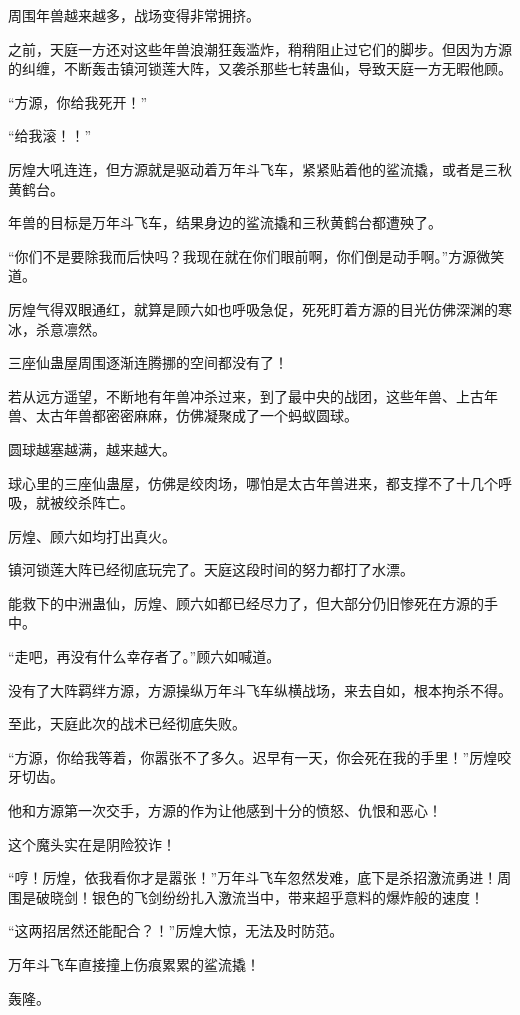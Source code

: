 \begin{this_body}
周围年兽越来越多，战场变得非常拥挤。

之前，天庭一方还对这些年兽浪潮狂轰滥炸，稍稍阻止过它们的脚步。但因为方源的纠缠，不断轰击镇河锁莲大阵，又袭杀那些七转蛊仙，导致天庭一方无暇他顾。

“方源，你给我死开！”

“给我滚！！”

厉煌大吼连连，但方源就是驱动着万年斗飞车，紧紧贴着他的鲨流撬，或者是三秋黄鹤台。

年兽的目标是万年斗飞车，结果身边的鲨流撬和三秋黄鹤台都遭殃了。

“你们不是要除我而后快吗？我现在就在你们眼前啊，你们倒是动手啊。”方源微笑道。

厉煌气得双眼通红，就算是顾六如也呼吸急促，死死盯着方源的目光仿佛深渊的寒冰，杀意凛然。

三座仙蛊屋周围逐渐连腾挪的空间都没有了！

若从远方遥望，不断地有年兽冲杀过来，到了最中央的战团，这些年兽、上古年兽、太古年兽都密密麻麻，仿佛凝聚成了一个蚂蚁圆球。

圆球越塞越满，越来越大。

球心里的三座仙蛊屋，仿佛是绞肉场，哪怕是太古年兽进来，都支撑不了十几个呼吸，就被绞杀阵亡。

厉煌、顾六如均打出真火。

镇河锁莲大阵已经彻底玩完了。天庭这段时间的努力都打了水漂。

能救下的中洲蛊仙，厉煌、顾六如都已经尽力了，但大部分仍旧惨死在方源的手中。

“走吧，再没有什么幸存者了。”顾六如喊道。

没有了大阵羁绊方源，方源操纵万年斗飞车纵横战场，来去自如，根本拘杀不得。

至此，天庭此次的战术已经彻底失败。

“方源，你给我等着，你嚣张不了多久。迟早有一天，你会死在我的手里！”厉煌咬牙切齿。

他和方源第一次交手，方源的作为让他感到十分的愤怒、仇恨和恶心！

这个魔头实在是阴险狡诈！

“哼！厉煌，依我看你才是嚣张！”万年斗飞车忽然发难，底下是杀招激流勇进！周围是破晓剑！银色的飞剑纷纷扎入激流当中，带来超乎意料的爆炸般的速度！

“这两招居然还能配合？！”厉煌大惊，无法及时防范。

万年斗飞车直接撞上伤痕累累的鲨流撬！

轰隆。


\end{this_body}
